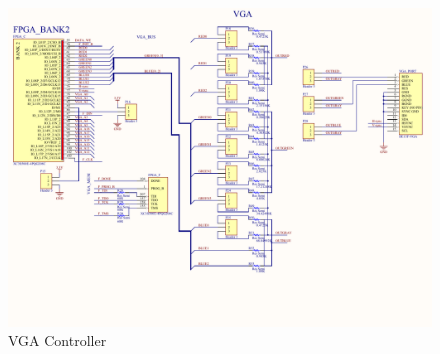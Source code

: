 \begin{figure}[h]
  \centering
  \includegraphics[angle=90, width=\textwidth]{fig/pcb/schematics/pcbschematic_vgacontroller.pdf}
  \caption{VGA Controller}
  \label{fig:schematic-pcb-vgacontroller}
\end{figure}
